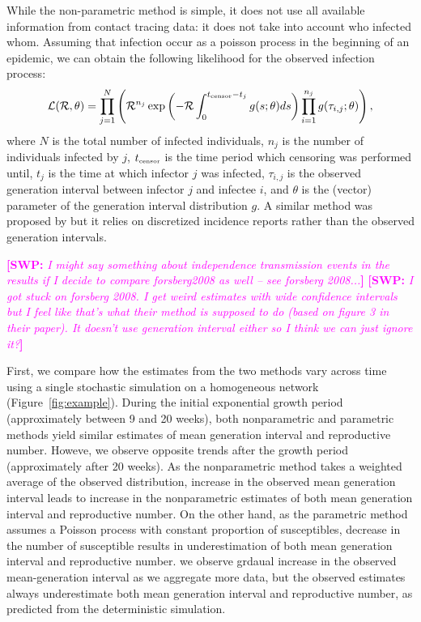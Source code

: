 \documentclass[12pt]{article}
\newcommand{\RR}{\ensuremath{{\mathcal R}}}
\newcommand{\tsub}[2]{#1_{{\textrm{\tiny #2}}}}
\newcommand{\comment}[3]{\textcolor{#1}{\textbf{[#2: }\textsl{#3}\textbf{]}}}
\newcommand{\swp}[1]{\comment{magenta}{SWP}{#1}}
\begin{document}
While the non-parametric method is simple, it does not use all available information from contact tracing data: it does not take into account who infected whom.
Assuming that infection occur as a poisson process in the beginning of an epidemic, we can obtain the following likelihood for the observed infection process:
\begin{equation}
\mathcal{L}(\RR, \theta) = \prod_{j=1}^N \left(\RR^{n_j} \exp \left(- \RR \int_0^{\tsub{t}{censor} - t_j} g(s;\theta) ds \right) \prod_{i=1}^{n_j} g(\tau_{i, j}; \theta) \right),
\end{equation}
where $N$ is the total number of infected individuals, $n_j$ is the number of individuals infected by $j$, $\tsub{t}{censor}$ is the time period which censoring was performed until, $t_j$ is the time at which infector $j$ was infected, $\tau_{i,j}$ is the observed generation interval between infector $j$ and infectee $i$, and $\theta$ is the (vector) parameter of the generation interval distribution $g$.
A similar method was proposed by \cite{forsberg2008likelihood} but it relies on discretized incidence reports rather than the observed generation intervals.

\swp{I might say something about independence transmission events in the results if I decide to compare forsberg2008 as well -- see forsberg 2008...}
\swp{I got stuck on forsberg 2008. I get weird estimates with wide confidence intervals but I feel like that's what their method is supposed to do (based on figure 3 in their paper). It doesn't use generation interval either so I think we can just ignore it?}

First, we compare how the estimates from the two methods vary across time using a single stochastic simulation on a homogeneous network (Figure~\ref{fig:example}).
During the initial exponential growth period (approximately between 9 and 20 weeks), both nonparametric and parametric methods yield similar estimates of mean generation interval and reproductive number.
Howeve, we observe opposite trends after the growth period (approximately after 20 weeks).
As the nonparametric method takes a weighted average of the observed distribution, increase in the observed mean generation interval leads to increase in the nonparametric estimates of both mean generation interval and reproductive number.
On the other hand, as the parametric method assumes a Poisson process with constant proportion of susceptibles, decrease in the number of susceptible results in underestimation of both mean generation interval and reproductive number.
we observe grdaual increase in the observed mean-generation interval as we aggregate more data, but the observed estimates always underestimate both mean generation interval and reproductive number, as predicted from the deterministic simulation.
\end{document}
